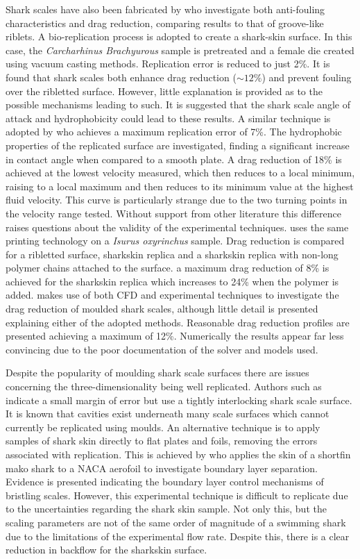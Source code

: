 \documentclass[12pt,oneside,a4paper]{article}
\begin{document}
Shark scales have also been fabricated by \cite{chen2014} who investigate both anti-fouling characteristics and drag reduction, comparing results to that of groove-like riblets. A bio-replication process is adopted to create a shark-skin surface. In this case, the \textit{Carcharhinus Brachyurous} sample is pretreated and a female die created using vacuum casting methods. Replication error is reduced to just 2\%. It is found that shark scales both enhance drag reduction ($\sim12\%$) and prevent fouling over the ribletted surface. However, little explanation is provided as to the possible mechanisms leading to such. It is suggested that the shark scale angle of attack and hydrophobicity could lead to these results. A similar technique is adopted by \cite{zhao2012} who achieves a maximum replication error of 7\%. The hydrophobic properties of the replicated surface are investigated, finding a significant increase in contact angle when compared to a smooth plate. A drag reduction of 18\% is achieved at the lowest velocity measured, which then reduces to a local minimum, raising to a local maximum and then reduces to its minimum value at the highest fluid velocity. This curve is particularly strange due to the two turning points in the velocity range tested. Without support from other literature this difference raises questions about the validity of the experimental techniques. \cite{zhang2011b} uses the same printing technology on a \textit{Isurus oxyrinchus} sample. Drag reduction is compared for a ribletted surface, sharkskin replica and a sharkskin replica with non-long polymer chains attached to the surface. a maximum drag reduction of 8\% is achieved for the sharkskin replica which increases to 24\% when the polymer is added. \cite{luo2015} makes use of both CFD and experimental techniques to investigate the drag reduction of moulded shark scales, although little detail is presented explaining either of the adopted methods. Reasonable drag reduction profiles are presented achieving a maximum of 12\%. Numerically the results appear far less convincing due to the poor documentation of the solver and models used.

Despite the popularity of moulding shark scale surfaces there are issues concerning the three-dimensionality being well replicated. Authors such as \cite{chen2014} indicate a small margin of error but use a tightly interlocking shark scale surface. It is known that cavities exist underneath many scale surfaces which cannot currently be replicated using moulds. An alternative technique is to apply samples of shark skin directly to flat plates and foils, removing the errors associated with replication. This is achieved by \cite{lang2014} who applies the skin of a shortfin mako shark to a NACA aerofoil to investigate boundary layer separation. Evidence is presented indicating the boundary layer control mechanisms of bristling scales.
However, this experimental technique is difficult to replicate due to the uncertainties regarding the shark skin sample. Not only this, but the scaling parameters are not of the same order of magnitude of a swimming shark due to the limitations of the experimental flow rate. Despite this, there is a clear reduction in backflow for the sharkskin surface. 
\end{document}

